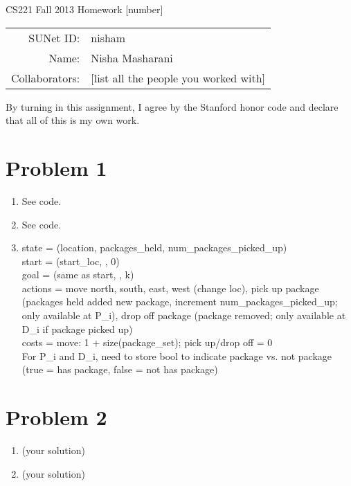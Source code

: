 \documentclass[12pt]{article}
\begin{document}
\begin{center}
{\Large CS221 Fall 2013 Homework [number]}

\begin{tabular}{rl}
SUNet ID: & nisham \\
Name: & Nisha Masharani \\
Collaborators: & [list all the people you worked with]
\end{tabular}
\end{center}

By turning in this assignment, I agree by the Stanford honor code and declare
that all of this is my own work.

\section*{Problem 1}

\begin{enumerate}[label=(\alph*)]
  \item See code.
  \item See code.
  \item state = (location, packages_held, num_packages_picked_up)\\
  start = (start_loc, {}, 0)\\
  goal = (same as start, {}, k)\\
  actions = move north, south, east, west (change loc), pick up package (packages held added new package, increment num_packages_picked_up; only available at P_i), drop off package (package removed; only available at D_i if package picked up)\\
  costs = move: 1 + size(package_set); pick up/drop off = 0
  \\ For P_i and D_i, need to store bool to indicate package vs. not package (true = has package, false = not has package)
\end{enumerate}

\section*{Problem 2}

\begin{enumerate}[label=(\alph*)]
  \item (your solution)
  \item (your solution)
\end{enumerate}
\end{document}
